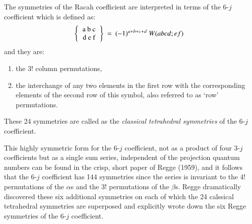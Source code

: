 The symmetries of the Racah coefficient are interpreted in terms of the 6-$j$ coefficient which is defined as:
\begin{equation}
\left\{\begin{tabular} {c} 
a\ b\ c\\ 
d\ e\ f \\ 
\end{tabular} \right\} 
\ =\ (-1)^{a+b+c+d}\ W(abcd;ef) \label{chap7-eq28}
\end{equation}
and they are:
\begin{enumerate}
\item the 3! column permutations,
\item the interchange of any two elements in the first row with the corresponding elements of the second row of this symbol, also referred to as `row' permutations.
\end{enumerate}

These 24 symmetries are called as the \textit{classical tetrahedral symmetries} of the 6-$j$ coefficient.

This highly symmetric form for the 6-$j$ coefficient, not as a product of four 3-$j$ coefficients but as a single sum series, independent of the projection quantum numbers can be found in the crisp, short paper of Regge (1959), and it follows that the 6-$j$ coefficient has 144 symmetries since the series is invariant to the 4! permutations of the $\alpha$s and the 3! permutations of the $\beta$s. Regge dramatically discovered these six additional symmetries on each of which the 24 calssical tetrahedral symmetries are superposed and explicitly wrote down the six Regge symmetries of the 6-$j$ coefficient.

